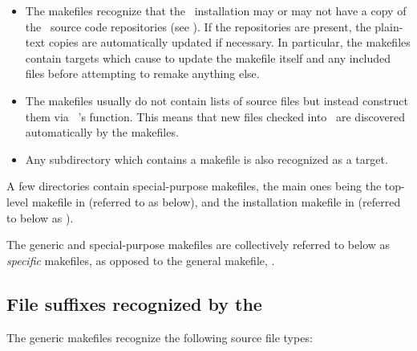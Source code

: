 \begin{itemize}
\item
   The makefiles recognize that the \aipspp\ installation may or may not
   have a copy of the \rcs\ source code repositories (see
   ).  If the repositories are present, the plain-text
   copies are automatically updated if necessary.  In particular, the
   makefiles contain targets which cause  to update the makefile
   itself and any included files before attempting to remake anything else.

\item
   The makefiles usually do not contain lists of source files but instead
   construct them via \gnu\ 's  function.  This
   means that new files checked into \aipspp\ are discovered automatically by
   the makefiles.

\item
   Any subdirectory which contains a makefile is also recognized as a target.
\end{itemize}

A few directories contain special-purpose makefiles, the main ones being the
top-level makefile in  (referred to as  below), and
the installation makefile in  (referred to below as
).

The generic and special-purpose makefiles are collectively referred to below
as {\em specific} makefiles, as opposed to the general makefile,
.

\subsection*{File suffixes recognized by the }

The generic makefiles recognize the following source file types:


